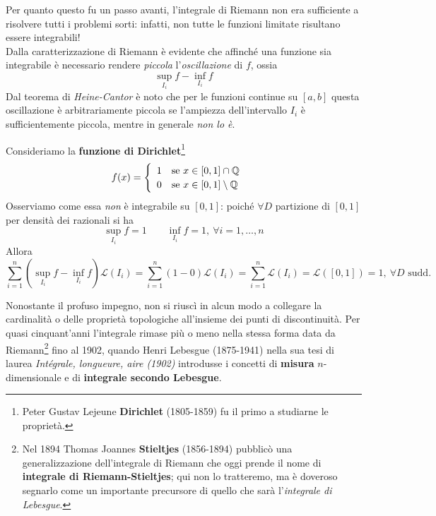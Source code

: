 Per quanto questo fu un passo avanti, l'integrale di Riemann non era sufficiente a risolvere tutti i problemi sorti: infatti, non tutte le funzioni limitate risultano essere integrabili!\\
Dalla caratterizzazione di Riemann è evidente che affinché una funzione sia integrabile è necessario rendere \textit{piccola} l’\textit{oscillazione} di $f$, ossia
\begin{equation*}
	\sup_{I_i}f-\inf_{I_i}f
\end{equation*}
Dal teorema di \textit{Heine-Cantor} è noto che per le funzioni continue su $\left[a,b\right]$ questa oscillazione è arbitrariamente piccola se l’ampiezza dell’intervallo $I_i$ è
sufficientemente piccola, mentre in generale \textit{non lo è}.
\begin{examplewt}\label{funzionedirichlet}
	Consideriamo la \textbf{funzione di Dirichlet}\footnote{Peter Gustav Lejeune \textbf{Dirichlet} (1805-1859) fu il primo a studiarne le proprietà.}
	\begin{equation}
		f(x)=
		\begin{cases}
			\begin{array}{ll}
				1&\text{se }x\in\left[0,1\right]\cap\mathbb{Q}\\
				0&\text{se }x\in\left[0,1\right]\setminus\mathbb{Q}\\
			\end{array}
		\end{cases}
	\end{equation}
Osserviamo come essa \textit{non} è integrabile su $\left[0,1\right]$: poiché $\forall D$ partizione di $\left[0,1\right]$ per densità dei razionali si ha
\begin{equation*}
	\sup_{I_i}f=1\qquad	\inf_{I_i}f=1,\ \forall i=1,\ldots,n
\end{equation*}
Allora
\begin{equation*}
	\sum_{i=1}^{n}\left(\sup_{I_i}f-\inf_{I_i}f\right)\mathcal{L}\left(I_i\right)=\sum_{i=1}^{n}\left(1-0\right)\mathcal{L}\left(I_i\right)=\sum_{i=1}^{n}\mathcal{L}\left(I_i\right)=\mathcal{L}\left(\left[0,1\right]\right)=1,\ \forall D\text{ sudd.}
\end{equation*}
\end{examplewt}
Nonostante il profuso impegno, non si riuscì in alcun modo a collegare la cardinalità o delle proprietà topologiche all'insieme dei punti di discontinuità. Per quasi cinquant'anni l'integrale rimase più o meno nella stessa forma data da Riemann\footnote{Nel 1894 Thomas Joannes \textbf{Stieltjes} (1856-1894) pubblicò una generalizzazione dell'integrale di Riemann che oggi prende il nome di \textbf{integrale di Riemann-Stieltjes}; qui non lo tratteremo, ma è doveroso segnarlo come un importante precursore di quello che sarà l'\textit{integrale di Lebesgue}.} fino al 1902, quando Henri Lebesgue (1875-1941) nella sua tesi di laurea \textit{Intégrale, longueure, aire (1902)} introdusse i concetti di \textbf{misura} $n$-dimensionale e di \textbf{integrale secondo Lebesgue}.\\
